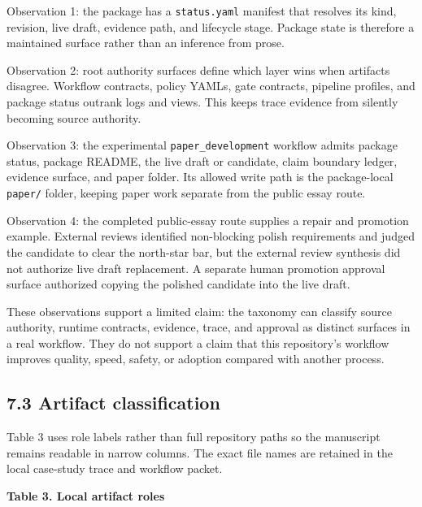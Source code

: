 \documentclass[
]{article}
\begin{document}
Observation 1: the package has a \texttt{status.yaml} manifest that
resolves its kind, revision, live draft, evidence path, and lifecycle
stage. Package state is therefore a maintained surface rather than an
inference from prose.

Observation 2: root authority surfaces define which layer wins when
artifacts disagree. Workflow contracts, policy YAMLs, gate contracts,
pipeline profiles, and package status outrank logs and views. This keeps
trace evidence from silently becoming source authority.

Observation 3: the experimental \texttt{paper\_development} workflow
admits package status, package README, the live draft or candidate,
claim boundary ledger, evidence surface, and paper folder. Its allowed
write path is the package-local \texttt{paper/} folder, keeping paper
work separate from the public essay route.

Observation 4: the completed public-essay route supplies a repair and
promotion example. External reviews identified non-blocking polish
requirements and judged the candidate to clear the north-star bar, but
the external review synthesis did not authorize live draft replacement.
A separate human promotion approval surface authorized copying the
polished candidate into the live draft.

These observations support a limited claim: the taxonomy can classify
source authority, runtime contracts, evidence, trace, and approval as
distinct surfaces in a real workflow. They do not support a claim that
this repository's workflow improves quality, speed, safety, or adoption
compared with another process.

\subsection{7.3 Artifact classification}\label{artifact-classification}

Table 3 uses role labels rather than full repository paths so the
manuscript remains readable in narrow columns. The exact file names are
retained in the local case-study trace and workflow packet.

\textbf{Table 3. Local artifact roles}
\end{document}
